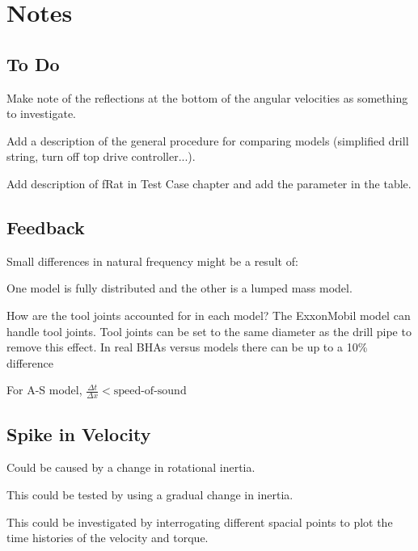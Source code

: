 \chapter{Notes}

\section{To Do}
\begin{bulletedlist}
	\item Make note of the reflections at the bottom of the angular velocities as something to investigate.
	\item Add a description of the general procedure for comparing models (simplified drill string, turn off top drive controller...).
    \item Add description of fRat in Test Case chapter and add the parameter in the table.
\end{bulletedlist}

\section{Feedback}
Small differences in natural frequency might be a result of:
\begin{bulletedlist}
	\item One model is fully distributed and the other is a lumped mass model.
	\item How are the tool joints accounted for in each model?  The ExxonMobil model can handle tool joints.  Tool joints can be set to the same diameter as the drill pipe to remove this effect.  In real BHAs versus models there can be up to a 10\% difference
	\item For A-S model, $\frac{\Delta t}{\Delta x} < \textrm{speed-of-sound}$
\end{bulletedlist}

\section{Spike in Velocity}
\begin{bulletedlist}
	\item Could be caused by a change in rotational inertia.
	\item This could be tested by using a gradual change in inertia.
	\item This could be investigated by interrogating different spacial points to plot the time histories of the velocity and torque.
\end{bulletedlist}

